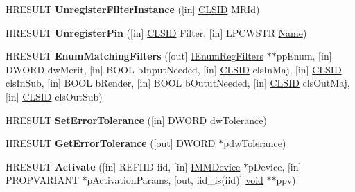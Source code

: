 \begin{DoxyCompactItemize}
\mbox{\label{interfacestruct_a7b4867ebab24530fddb0d22dfa7cf94f}} 
H\+R\+E\+S\+U\+LT {\bfseries Unregister\+Filter\+Instance} (\mbox{[}in\mbox{]} \hyperlink{struct___i_i_d}{C\+L\+S\+ID} M\+R\+Id)
\item 
\mbox{\label{interfacestruct_af51ee7e26b2a540a1500a0acc32d3239}} 
H\+R\+E\+S\+U\+LT {\bfseries Unregister\+Pin} (\mbox{[}in\mbox{]} \hyperlink{struct___i_i_d}{C\+L\+S\+ID} Filter, \mbox{[}in\mbox{]} L\+P\+C\+W\+S\+TR \hyperlink{struct_name_rec__}{Name})
\item 
\mbox{\label{interfacestruct_a07c99127408a7eb68d7d1717f5e80327}} 
H\+R\+E\+S\+U\+LT {\bfseries Enum\+Matching\+Filters} (\mbox{[}out\mbox{]} \hyperlink{interface_i_enum_reg_filters}{I\+Enum\+Reg\+Filters} $\ast$$\ast$pp\+Enum, \mbox{[}in\mbox{]} D\+W\+O\+RD dw\+Merit, \mbox{[}in\mbox{]} B\+O\+OL b\+Input\+Needed, \mbox{[}in\mbox{]} \hyperlink{struct___i_i_d}{C\+L\+S\+ID} cls\+In\+Maj, \mbox{[}in\mbox{]} \hyperlink{struct___i_i_d}{C\+L\+S\+ID} cls\+In\+Sub, \mbox{[}in\mbox{]} B\+O\+OL b\+Render, \mbox{[}in\mbox{]} B\+O\+OL b\+Outut\+Needed, \mbox{[}in\mbox{]} \hyperlink{struct___i_i_d}{C\+L\+S\+ID} cls\+Out\+Maj, \mbox{[}in\mbox{]} \hyperlink{struct___i_i_d}{C\+L\+S\+ID} cls\+Out\+Sub)
\item 
\mbox{\label{interfacestruct_a74de188e2a7d3c1895669054238c0ed7}} 
H\+R\+E\+S\+U\+LT {\bfseries Set\+Error\+Tolerance} (\mbox{[}in\mbox{]} D\+W\+O\+RD dw\+Tolerance)
\item 
\mbox{\label{interfacestruct_af8d9857012b44df8d040cc4283f54311}} 
H\+R\+E\+S\+U\+LT {\bfseries Get\+Error\+Tolerance} (\mbox{[}out\mbox{]} D\+W\+O\+RD $\ast$pdw\+Tolerance)
\item 
\mbox{\label{interfacestruct_a3825dcfc927dc660a9124c75698a3d0a}} 
H\+R\+E\+S\+U\+LT {\bfseries Activate} (\mbox{[}in\mbox{]} R\+E\+F\+I\+ID iid, \mbox{[}in\mbox{]} \hyperlink{interface_i_m_m_device}{I\+M\+M\+Device} $\ast$p\+Device, \mbox{[}in\mbox{]} P\+R\+O\+P\+V\+A\+R\+I\+A\+NT $\ast$p\+Activation\+Params, \mbox{[}out, iid\+\_\+is(iid)\mbox{]} \hyperlink{interfacevoid}{void} $\ast$$\ast$ppv)
\item 
\mbox{\label{interfacestruct_a154edc5db7c7cc172d206aff8d35d944}} 

\end{DoxyCompactItemize}
